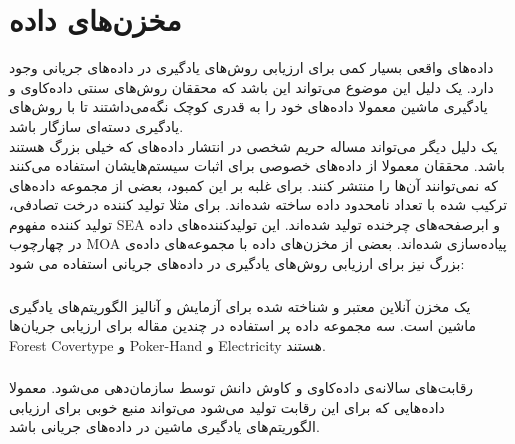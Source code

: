 \section{مخزن‌های داده}
داده‌های واقعی بسیار کمی برای ارزیابی روش‌های یادگیری در داده‌های جریانی وجود دارد. یک دلیل این ‌موضوع می‌تواند این باشد که محققان روش‌های سنتی داده‌کاوی و یادگیری ماشین معمولا داده‌های خود را به قدری کوچک نگه‌می‌داشتند تا با روش‌های یادگیری دسته‌ای
سازگار باشد.
\\
 یک دلیل دیگر می‌تواند مساله حریم شخصی در انتشار داده‌های که خیلی بزرگ هستند باشد. محققان معمولا از داده‌های خصوصی برای اثبات سیستم‌هایشان استفاده می‌کنند که نمی‌توانند آن‌ها را منتشر کنند. برای غلبه بر این کمبود، بعضی از مجموعه داده‌های ترکیب شده با تعداد نامحدود داده ساخته شده‌اند. برای مثلا تولید کننده ‌درخت تصادفی، تولید‌ کننده مفهوم SEA و ابرصفحه‌های چرخنده تولید شده‌اند. این تولیدکننده‌های داده در چهارچوب MOA پیاده‌سازی شده‌اند. بعضی از مخزن‌های داده با مجموعه‌های داده‌ی بزرگ نیز برای ارزیابی روش‌های یادگیری در داده‌های جریانی استفاده می شود:
\subsubsection{}
یک مخزن آنلاین معتبر  و شناخته شده برای آزمایش و آنالیز الگوریتم‌های یادگیری ماشین است. سه مجموعه داده پر استفاده در چندین مقاله برای ارزیابی جریان‌ها Forest Covertype و Poker-Hand و Electricity هستند.
\subsubsection{}
رقابت‌های سالانه‌ی داده‌کاوی و کاوش دانش توسط
سازمان‌دهی می‌شود. معمولا داده‌هایی که برای این رقابت تولید می‌شود می‌تواند منبع خوبی برای ارزیابی الگوریتم‌های یادگیری ماشین در داده‌های جریانی باشد.
